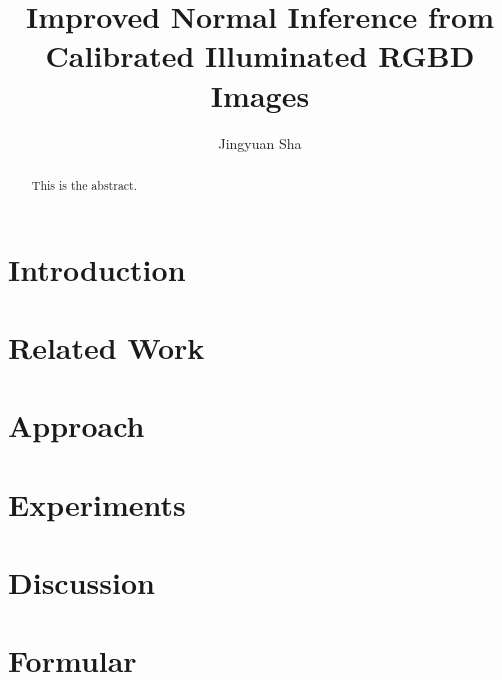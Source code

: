 \documentclass[]{report}
\title{Improved Normal Inference from Calibrated Illuminated RGBD Images}
\author{Jingyuan Sha}
\begin{document}
\maketitle

\begin{abstract}
	This is the abstract.
\end{abstract}



\newpage
\chapter{Introduction}



\newpage
\chapter{Related Work}


\newpage
\chapter{Approach}


\newpage
\chapter{Experiments}


\newpage
\chapter{Discussion}


\newpage
\chapter{Formular}



\medskip



\end{document}

